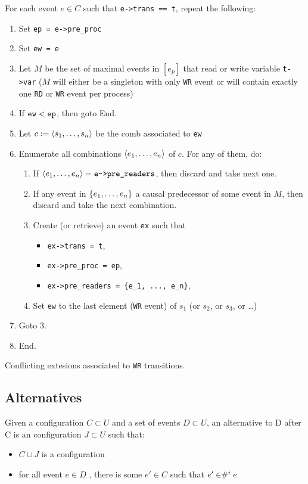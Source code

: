\documentclass{llncs}
\begin{document}
\begin{algorithm}
\noindent
For each event $e \in C$ such that \verb!e->trans == t!, repeat the following:
\begin{enumerate}
\item Set \verb!ep = e->pre_proc!
\item Set \verb!ew = e!
\item
  Let $M$ be the set of maximal events in $[e_p]$ that read or write variable
  \verb!t->var! ($M$ will either be a singleton with only \verb!WR! event or
  will contain exactly one \verb!RD! or \verb!WR! event per process)
\item If $\verb!ew! < \verb!ep!$, then goto End.
\item Let $c \mathrel{:=} \langle s_1, \ldots, s_n\rangle$ be the comb associated to \verb!ew!
\item
  Enumerate all combinations $\langle e_1, \ldots, e_n\rangle$ of $c$.
  For any of them, do:
  \begin{enumerate}
  \item
    If $\tup{e_1, \ldots, e_n} = \verb!e->pre_readers!$, then discard and take
    next one.
  \item
    If any event in ${\{ e_1, \ldots, e_n \mathclose \}}$ a causal predecessor of some event in
    $M$, then discard and take the next combination.
  \item
    Create (or retrieve) an event \verb!ex! such that
    \begin{itemize}
    \item \verb!ex->trans = t!,
    \item \verb!ex->pre_proc = ep!,
    \item \verb!ex->pre_readers = {e_1, ..., e_n}!,
    \end{itemize}
  \item
    Set \verb!ew! to the last element (\verb!WR! event) of $s_1$
    (or $s_2$, or $s_3$, or \ldots)
  \end{enumerate}
\item Goto 3.
\item End.
\end{enumerate}
\caption{Conflicting extesions associated to \texttt{WR} transitions.}
\label{a:cex_wr}
\end{algorithm}

\subsection{Alternatives}
Given a configuration $C \subset U$ and a set of events $D \subset U$, an alternative to D after C is an configuration $J \subset U $ such that:
\begin{itemize}
\item $C \cup J$ is a configuration
\item for all event $e \in D$ , there is some $e'\in C$ such that $e' \in \mathrel{\#^i_{}}{e}$
\end{itemize}
\end{document}
